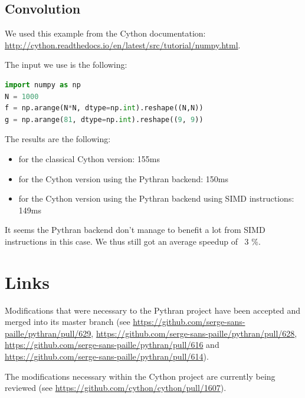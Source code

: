 \documentclass{deliverablereport}
\begin{document}
\subsection{Convolution}

We used this example from the Cython documentation:
\url{http://cython.readthedocs.io/en/latest/src/tutorial/numpy.html}.

The input we use is the following:

\begin{lstlisting}[language=python]
import numpy as np
N = 1000
f = np.arange(N*N, dtype=np.int).reshape((N,N))
g = np.arange(81, dtype=np.int).reshape((9, 9))
\end{lstlisting}

The results are the following:

\begin{itemize}
  \item for the classical Cython version: 155ms
  \item for the Cython version using the Pythran backend: 150ms
  \item for the Cython version using the Pythran backend using SIMD instructions: 149ms
\end{itemize}

It seems the Pythran backend don't manage to benefit a lot from SIMD
instructions in this case. We thus still got an average speedup of ~3 \%.

\section{Links}
\label{sec:links}

Modifications that were necessary to the Pythran project have been accepted and
merged into its master branch (see
\url{https://github.com/serge-sans-paille/pythran/pull/629},
\url{https://github.com/serge-sans-paille/pythran/pull/628},
\url{https://github.com/serge-sans-paille/pythran/pull/616} and
\url{https://github.com/serge-sans-paille/pythran/pull/614}).

The modifications necessary within the Cython project are currently being reviewed
(see \url{https://github.com/cython/cython/pull/1607}).

\printbibliography
\end{document}
